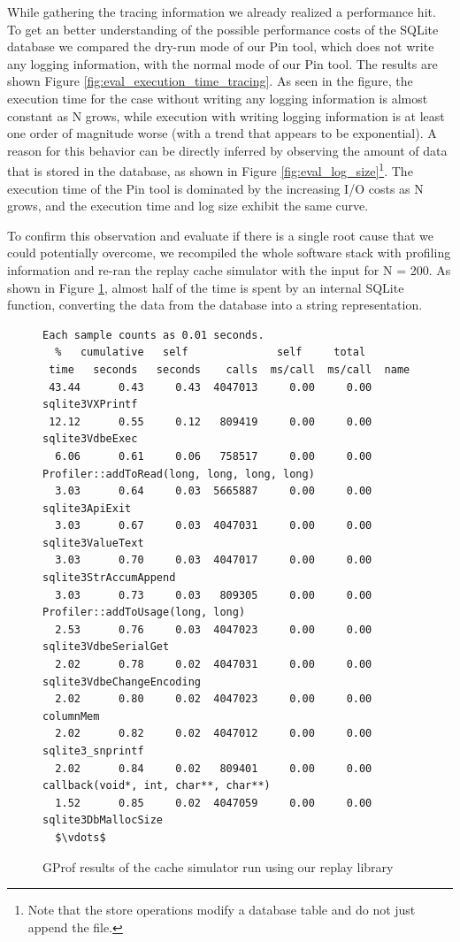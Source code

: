 While gathering the tracing information we already realized a
performance hit. To get an better understanding of the possible
performance costs of the SQLite database we compared the dry-run mode
of our Pin tool, which does not write any logging information, with
the normal mode of our Pin tool. The results are shown Figure
\ref{fig:eval_execution_time_tracing}. As seen in the figure, the
execution time for the case without writing any logging information
is almost constant as N grows, while execution with writing logging
information is at least one order of magnitude worse (with a trend
that appears to be exponential). A reason for this behavior can be directly 
inferred by observing the amount of data that is stored in the
database, as shown in Figure \ref{fig:eval_log_size}\footnote{Note
  that the store operations modify a database table and do not just
  append the file.}. The execution time of the Pin tool is dominated
by the increasing I/O costs as N grows, and the execution time
and log size exhibit the same curve.
   
To confirm this observation and evaluate if there
is a single root cause that we could potentially overcome, we recompiled
the whole software stack with profiling information and re-ran the
replay cache simulator with the input for N = 200. As shown in
Figure \ref{fig:profiler}, almost half of the time is spent by
an internal SQLite function, converting the data from the database
into a string representation.


\begin{figure}
  \lstset{basicstyle=\footnotesize, mathescape=true}
  \begin{lstlisting}
Each sample counts as 0.01 seconds.
  %   cumulative   self              self     total           
 time   seconds   seconds    calls  ms/call  ms/call  name    
 43.44      0.43     0.43  4047013     0.00     0.00  sqlite3VXPrintf
 12.12      0.55     0.12   809419     0.00     0.00  sqlite3VdbeExec
  6.06      0.61     0.06   758517     0.00     0.00  Profiler::addToRead(long, long, long, long)
  3.03      0.64     0.03  5665887     0.00     0.00  sqlite3ApiExit
  3.03      0.67     0.03  4047031     0.00     0.00  sqlite3ValueText
  3.03      0.70     0.03  4047017     0.00     0.00  sqlite3StrAccumAppend
  3.03      0.73     0.03   809305     0.00     0.00  Profiler::addToUsage(long, long)
  2.53      0.76     0.03  4047023     0.00     0.00  sqlite3VdbeSerialGet
  2.02      0.78     0.02  4047031     0.00     0.00  sqlite3VdbeChangeEncoding
  2.02      0.80     0.02  4047023     0.00     0.00  columnMem
  2.02      0.82     0.02  4047012     0.00     0.00  sqlite3_snprintf
  2.02      0.84     0.02   809401     0.00     0.00  callback(void*, int, char**, char**)
  1.52      0.85     0.02  4047059     0.00     0.00  sqlite3DbMallocSize
  $\vdots$
  \end{lstlisting}
  \caption{GProf results of the cache simulator run using our replay library}
  \label{fig:profiler}
\end{figure}


